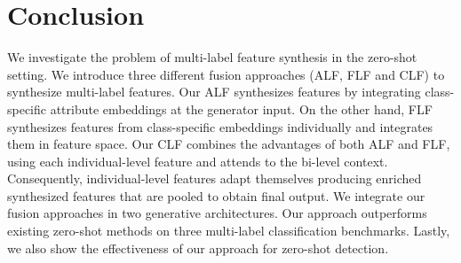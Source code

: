 \documentclass[final]{cvpr}
\begin{document}
\begin{table}[t]
\centering
\caption{State-of-the-art comparison for ZSD and GZSD tasks on MS COCO. The results are reported in terms of Recall. For GZSD, we report the harmonic mean (HM) between seen and unseen classes. Our approach performs favorably against existing methods. Best results are in bold. }\vspace{0.2em}
\label{tab:sota_det_coco}
\vspace{-0.2cm}
\end{table}

\section{Conclusion}
We investigate the problem of multi-label feature synthesis in the zero-shot setting. We introduce three different fusion approaches (ALF, FLF and CLF) to synthesize multi-label features. Our ALF synthesizes features by integrating class-specific attribute embeddings at the generator input.
On the other hand, FLF synthesizes features from class-specific embeddings individually and integrates them in feature space. Our CLF combines the advantages of both ALF and FLF, using each individual-level feature and attends to the bi-level context. Consequently, individual-level features adapt themselves producing enriched synthesized features that are pooled to obtain final output. We integrate our fusion approaches in two generative architectures. Our approach outperforms existing zero-shot methods on three multi-label classification benchmarks. Lastly, we also show the effectiveness of our approach for zero-shot detection. 



{\small


}
\end{document}
